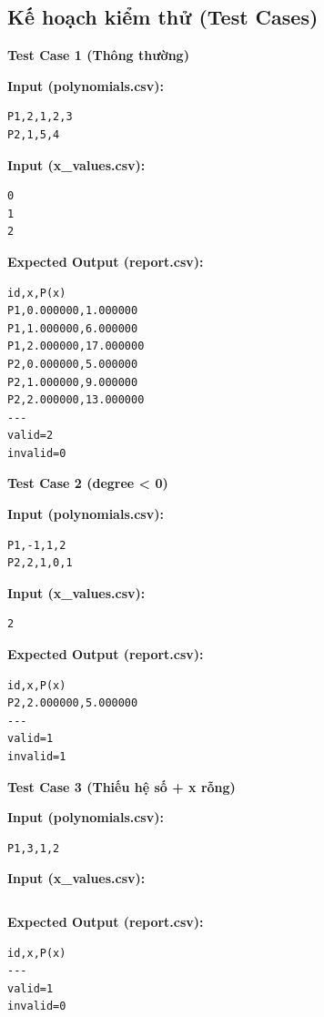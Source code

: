 \subsection{Kế hoạch kiểm thử (Test Cases)}

\textbf{Test Case 1 (Thông thường)}

\textbf{Input (polynomials.csv):}

\begin{lstlisting}
P1,2,1,2,3
P2,1,5,4
\end{lstlisting}

\textbf{Input (x\_values.csv):}

\begin{lstlisting}
0
1
2
\end{lstlisting}

\textbf{Expected Output (report.csv):}

\begin{lstlisting}
id,x,P(x)
P1,0.000000,1.000000
P1,1.000000,6.000000
P1,2.000000,17.000000
P2,0.000000,5.000000
P2,1.000000,9.000000
P2,2.000000,13.000000
---
valid=2
invalid=0
\end{lstlisting}

\vspace{0.5cm}

\textbf{Test Case 2 (degree < 0)}

\textbf{Input (polynomials.csv):}

\begin{lstlisting}
P1,-1,1,2
P2,2,1,0,1
\end{lstlisting}

\textbf{Input (x\_values.csv):}

\begin{lstlisting}
2
\end{lstlisting}

\textbf{Expected Output (report.csv):}

\begin{lstlisting}
id,x,P(x)
P2,2.000000,5.000000
---
valid=1
invalid=1
\end{lstlisting}

\vspace{0.5cm}

\textbf{Test Case 3 (Thiếu hệ số + x rỗng)}

\textbf{Input (polynomials.csv):}

\begin{lstlisting}
P1,3,1,2
\end{lstlisting}

\textbf{Input (x\_values.csv):}

\begin{lstlisting}

\end{lstlisting}

\textbf{Expected Output (report.csv):}

\begin{lstlisting}
id,x,P(x)
---
valid=1
invalid=0
\end{lstlisting}